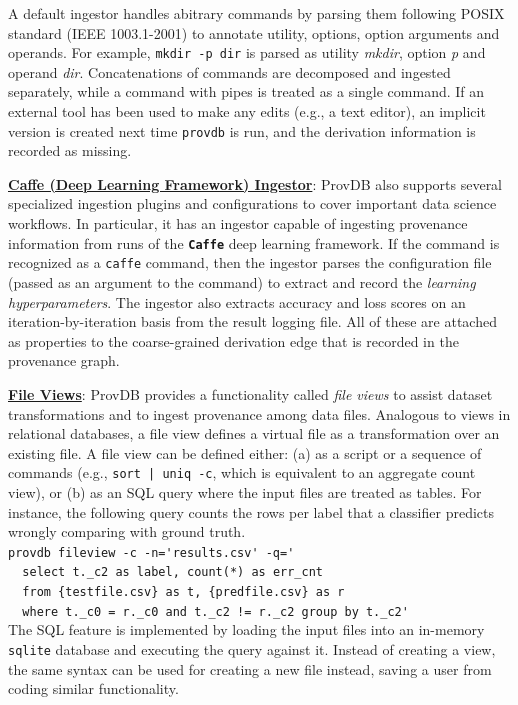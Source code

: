 \documentclass[11pt]{article}
\newcommand{\provdb}{{\sc ProvDB}\xspace}
\newcommand{\topic}[1]{\vspace{3pt}\noindent\underline{\bf #1}}
\begin{document}
A default ingestor handles abitrary commands by parsing them following  POSIX standard (IEEE 1003.1-2001) to annotate utility, options, option arguments and operands. For example, {\tt mkdir -p dir} is parsed as utility \emph{mkdir}, option \emph{p} and operand \emph{dir}. Concatenations of commands are decomposed and ingested separately, while a command with pipes is treated as a single command. If an external tool has been used to make any edits (e.g., a text editor), an implicit version is created next time {\tt provdb} is run, and the derivation information is recorded as missing. 


\topic{Caffe (Deep Learning Framework) Ingestor}:
\provdb also supports several specialized ingestion plugins and configurations to cover important data science workflows. In particular, it has an ingestor capable of
ingesting provenance information from runs of the {{\bfseries \tt Caffe} deep learning framework}. If the command is recognized as a {\tt caffe} command, then the
ingestor parses the configuration file (passed as an argument to the command) to extract and record the {\em learning hyperparameters}. The ingestor also extracts
accuracy and loss scores on an iteration-by-iteration basis from the result logging file. All of these are attached as properties to the coarse-grained
derivation edge that is recorded in the provenance graph.

\topic{File Views}: 
\provdb provides a functionality called \emph{file views} to assist dataset transformations and to ingest provenance among data files. Analogous to views in relational databases, a file view defines a virtual file as a transformation over an existing file. A file view can be defined either: (a) as a script or a sequence of commands (e.g., {\tt sort | uniq -c}, which is equivalent to an aggregate count view), or (b) as an SQL query where the input files are treated as tables. For instance, the following query counts the rows per label that a classifier predicts wrongly comparing with ground truth.
\\{\small{
\verb|provdb fileview -c -n='results.csv' -q='|\\
\verb|  select t._c2 as label, count(*) as err_cnt |\\
\verb|  from {testfile.csv} as t, {predfile.csv} as r|\\
\verb|  where t._c0 = r._c0 and t._c2 != r._c2 group by t._c2'|\\
}}
The SQL feature is implemented by loading the input files into an in-memory {\tt sqlite} database and executing the query against it. Instead of creating a view, the same syntax can be used for creating a new file instead, saving a user from coding similar functionality.
\end{document}
